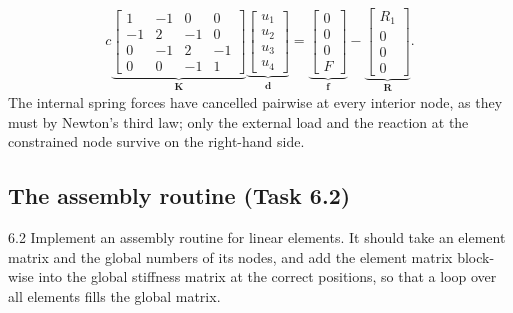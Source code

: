 \documentclass[11pt,a4paper]{article}
\numberwithin{equation}{section}
\theoremstyle{remark}
\newcommand{\bK}{\bm{K}}
\newcommand{\bR}{\bm{R}}
\newcommand{\bd}{\bm{d}}
\newcommand{\bff}{\bm{f}}
\begin{document}
\begin{equation}\label{eq:springsystem}
  \boxed{\;
  c\underbrace{\begin{bmatrix}
    1 & -1 & 0 & 0 \\
    -1 & 2 & -1 & 0 \\
    0 & -1 & 2 & -1 \\
    0 & 0 & -1 & 1
  \end{bmatrix}}_{\bK}
  \underbrace{\begin{bmatrix} u_1 \\ u_2 \\ u_3 \\ u_4 \end{bmatrix}}_{\bd}
  = \underbrace{\begin{bmatrix} 0 \\ 0 \\ 0 \\ F \end{bmatrix}}_{\bff}
  - \underbrace{\begin{bmatrix} R_1 \\ 0 \\ 0 \\ 0 \end{bmatrix}}_{\bR}. \;}
\end{equation}
The internal spring forces have cancelled pairwise at every interior node, as they must by
Newton's third law; only the external load and the reaction at the constrained node
survive on the right-hand side.

\subsection{The assembly routine (Task 6.2)}\label{sec:assemblyroutine}

\begin{task}{6.2}
  Implement an assembly routine for linear elements. It should take an element matrix and
  the global numbers of its nodes, and add the element matrix block-wise into the global
  stiffness matrix at the correct positions, so that a loop over all elements fills the
  global matrix.
\end{task}
\end{document}
